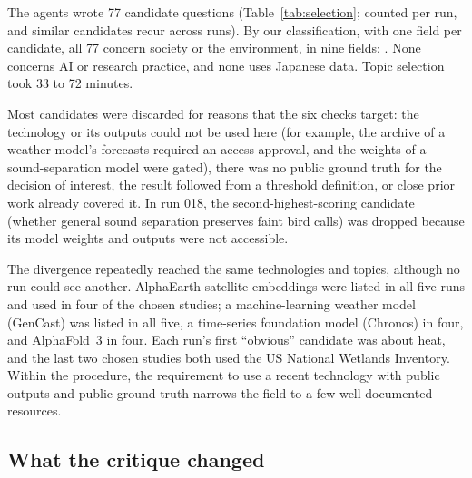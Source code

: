 \documentclass[11pt]{article}
\begin{document}
The agents wrote 77 candidate questions (Table~\ref{tab:selection}; counted per run, and similar candidates recur across runs). By our classification, with one field per candidate, all 77 concern society or the environment, in nine fields: . None concerns AI or research practice, and none uses Japanese data. Topic selection took 33 to 72 minutes.

Most candidates were discarded for reasons that the six checks target: the technology or its outputs could not be used here (for example, the archive of a weather model's forecasts required an access approval, and the weights of a sound-separation model were gated), there was no public ground truth for the decision of interest, the result followed from a threshold definition, or close prior work already covered it. In run 018, the second-highest-scoring candidate (whether general sound separation preserves faint bird calls) was dropped because its model weights and outputs were not accessible.

The divergence repeatedly reached the same technologies and topics, although no run could see another. AlphaEarth satellite embeddings were listed in all five runs and used in four of the chosen studies; a machine-learning weather model (GenCast) was listed in all five, a time-series foundation model (Chronos) in four, and AlphaFold~3 in four. Each run's first ``obvious'' candidate was about heat, and the last two chosen studies both used the US National Wetlands Inventory. Within the procedure, the requirement to use a recent technology with public outputs and public ground truth narrows the field to a few well-documented resources.

\subsection{What the critique changed}
\label{sec:res-critic}
\end{document}
